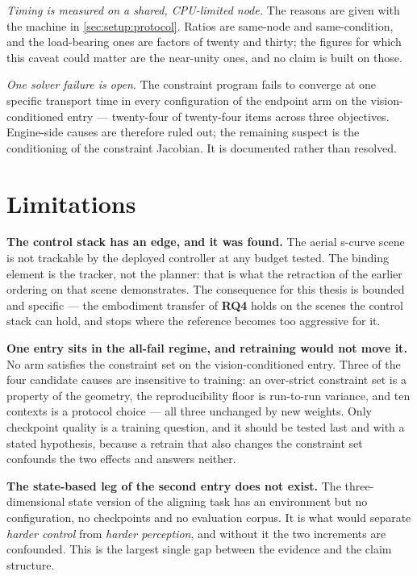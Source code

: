 \emph{Timing is measured on a shared, CPU-limited node.} The reasons are given with the machine in
\autoref{sec:setup:protocol}. Ratios are same-node and same-condition, and the load-bearing ones are
factors of twenty and thirty; the figures for which this caveat could matter are the near-unity ones,
and no claim is built on those.

\emph{One solver failure is open.} The constraint program fails to converge at one specific transport
time in every configuration of the endpoint arm on the vision-conditioned entry --- twenty-four of
twenty-four items across three objectives. Engine-side causes are therefore ruled out; the remaining
suspect is the conditioning of the constraint Jacobian. It is documented rather than resolved.

\section{Limitations}\label{sec:disc:limitations}

\textbf{The control stack has an edge, and it was found.} The aerial s-curve scene is not trackable
by the deployed controller at any budget tested. The binding element is the tracker, not the
planner: that is what the retraction of the earlier ordering on that scene demonstrates. The
consequence for this thesis is bounded and specific --- the embodiment transfer of \textbf{RQ4}
holds on the scenes the control stack can hold, and stops where the reference becomes too aggressive
for it.

\textbf{One entry sits in the all-fail regime, and retraining would not move it.} No arm satisfies
the constraint set on the vision-conditioned entry. Three of the four candidate causes are
insensitive to training: an over-strict constraint set is a property of the geometry, the
reproducibility floor is run-to-run variance, and ten contexts is a protocol choice --- all three
unchanged by new weights. Only checkpoint quality is a training question, and it should be tested
last and with a stated hypothesis, because a retrain that also changes the constraint set confounds
the two effects and answers neither. 

\textbf{The state-based leg of the second entry does not exist.} The three-dimensional state version
of the aligning task has an environment but no configuration, no checkpoints and no evaluation
corpus. It is what would separate \emph{harder control} from \emph{harder perception}, and without
it the two increments are confounded. This is the largest single gap between the evidence and the
claim structure.

